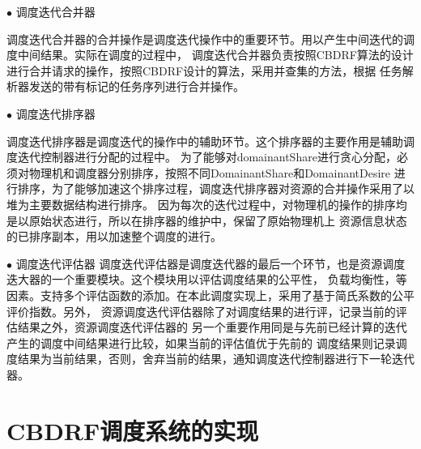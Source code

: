 $\bullet$ 调度迭代合并器

调度迭代合并器的合并操作是调度迭代操作中的重要环节。用以产生中间迭代的调度中间结果。实际在调度的过程中，
调度迭代合并器负责按照CBDRF算法的设计进行合并请求的操作，按照CBDRF设计的算法，采用并查集的方法，根据
任务解析器发送的带有标记的任务序列进行合并操作。

$\bullet$ 调度迭代排序器

调度迭代排序器是调度迭代的操作中的辅助环节。这个排序器的主要作用是辅助调度迭代控制器进行分配的过程中。
为了能够对domainantShare进行贪心分配，必须对物理机和调度器分别排序，按照不同DomainantShare和DomainantDesire
进行排序，为了能够加速这个排序过程，调度迭代排序器对资源的合并操作采用了以堆为主要数据结构进行排序。
因为每次的迭代过程中，对物理机的操作的排序均是以原始状态进行，所以在排序器的维护中，保留了原始物理机上
资源信息状态的已排序副本，用以加速整个调度的进行。

$\bullet$  调度迭代评估器
调度迭代评估器是调度迭代器的最后一个环节，也是资源调度迭大器的一个重要模块。这个模块用以评估调度结果的公平性，
负载均衡性，等因素。支持多个评估函数的添加。在本此调度实现上，采用了基于简氏系数的公平评价指数。另外，
资源调度迭代评估器除了对调度结果的进行评，记录当前的评估结果之外，资源调度迭代评估器的
另一个重要作用同是与先前已经计算的迭代产生的调度中间结果进行比较，如果当前的评估值优于先前的
调度结果则记录调度结果为当前结果，否则，舍弃当前的结果，通知调度迭代控制器进行下一轮迭代器。

\section{CBDRF调度系统的实现}

